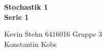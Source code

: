 \documentclass[10pt,a4paper]{article}
\begin{document}
\begin{center}
\textbf{Stochastik 1 \\ Serie 1 \\}
\end{center}

\begin{flushright}
Kevin Stehn 6416016 Gruppe 3 \\
Konstantin Kobs
\end{flushright}
\end{document}

